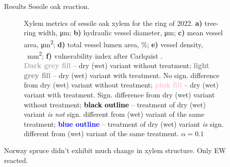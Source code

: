 \documentclass[final]{beamer}
\newlength{\sepwidth}
\newlength{\colwidth}
\newcommand{\separatorcolumn}{\begin{column}{\sepwidth}\end{column}}
\begin{document}
\begin{frame}[t]
\begin{columns}[t]
\begin{column}{\colwidth}
\end{column}


\begin{column}{\colwidth}

\begin{block}{Results}
Sessile oak reaction.

\begin{figure}
    
    \caption{
        Xylem metrics of sessile oak xylem for the ring of 2022.
        \textbf{a)} tree-ring width, \si{\micro\meter};
        \textbf{b)} hydraulic vessel diameter, \si{\micro\meter};
        \textbf{c)} mean vessel area, \si{\micro\meter\squared};
        \textbf{d)} total vessel lumen area, \%;
        \textbf{e)} vessel density, \si{\per\milli\meter\squared};
        \textbf{f)} vulnerability index after Carlquist \parencite{carlquist1977}. \\
        \textbf{\textcolor{darkgray}{Dark grey fill}} -- dry (wet) variant without treatment;
        \textbf{\textcolor{gray}{light grey fill}} -- dry (wet) variant with treatment. No sign. difference from dry (wet) variant without treatment;
        \textbf{\textcolor{pink}{pink fill}} -- dry (wet) variant with treatment. Sign. difference from dry (wet) variant without treatment;
        \textbf{\textcolor{black}{black outline}} -- treatment of dry (wet) variant \emph{is not} sign. different from (wet) variant of the same treatment;
        \textbf{\textcolor{blue}{blue outline}} -- treatment of dry (wet) variant \emph{is} sign. different from (wet) variant of the same treatment.
        $\alpha = 0.1$
    }
    \label{fig:oak_box}
\end{figure}

Norway spruce didn't exhibit much change in xylem structure. Only EW reacted.


\end{block}
\end{column}
\end{columns}
\end{frame}
\end{document}
